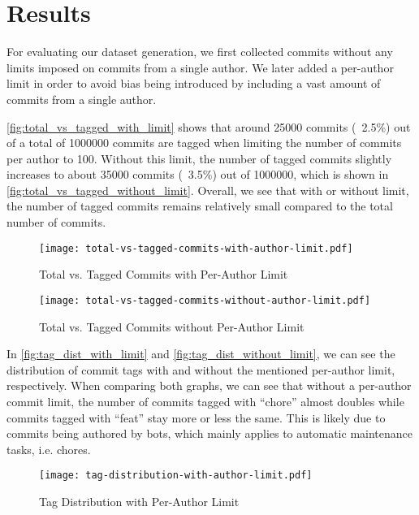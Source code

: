 \section{Results}
\label{sec:results}

For evaluating our dataset generation, we first collected commits without any limits imposed on commits from
a single author. We later added a per-author limit in order to avoid bias being introduced by including a
vast amount of commits from a single author.

\autoref{fig:total_vs_tagged_with_limit} shows that around 25000 commits (~2.5\%) out of a total of 1000000
commits are tagged when limiting the number of commits per author to 100. Without this limit, the number of
tagged commits slightly increases to about 35000 commits (~3.5\%) out of 1000000, which is shown in
\autoref{fig:total_vs_tagged_without_limit}. Overall, we see that with or without limit, the number of tagged
commits remains relatively small compared to the total number of commits.

\begin{figure}[H]
  \centering
  \texttt{[image: total-vs-tagged-commits-with-author-limit.pdf]}
  \caption{Total vs. Tagged Commits with Per-Author Limit}
  \label{fig:total_vs_tagged_with_limit}
\end{figure}

\begin{figure}[H]
  \centering
  \texttt{[image: total-vs-tagged-commits-without-author-limit.pdf]}
  \caption{Total vs. Tagged Commits without Per-Author Limit}
  \label{fig:total_vs_tagged_without_limit}
\end{figure}

In \autoref{fig:tag_dist_with_limit} and \autoref{fig:tag_dist_without_limit}, we can see the distribution
of commit tags with and without the mentioned per-author limit, respectively. When comparing both graphs,
we can see that without a per-author commit limit, the number of commits tagged with “chore” almost doubles
while commits tagged with “feat” stay more or less the same. This is likely due to commits being authored by
bots, which mainly applies to automatic maintenance tasks, i.e. chores.

\begin{figure}[H]
  \centering
  \texttt{[image: tag-distribution-with-author-limit.pdf]}
  \caption{Tag Distribution with Per-Author Limit}
  \label{fig:tag_dist_with_limit}
\end{figure}

